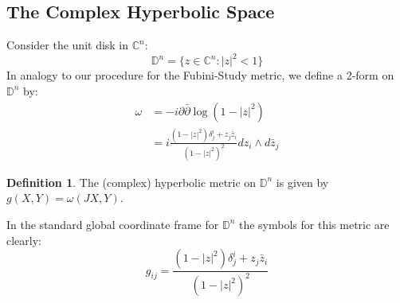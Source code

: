\documentclass[11pt]{amsart}
\theoremstyle{definition}
\newtheorem{definition}[subsection]{Definition}
\def \C{ \mathbb{C} }
\def \del{ \partial }
\def \delbar{ \bar{\partial} }
\def \disk{ \mathbb{D} }
\begin{document}
\subsection{The Complex Hyperbolic Space}

Consider the unit disk in $\C^n$:
%
$$ \disk^n = \{ z \in \C^n : |z|^2 < 1 \} $$
%
In analogy to our procedure for the Fubini-Study metric, we define a 2-form on $\disk^n$ by:
%
\begin{align*}
\omega &= - i \del \delbar \log ( 1 - |z|^2 ) \\
&= i \frac{ (1 - |z|^2) \delta^i_j + z_j \bar{z}_i }{ (1 - |z|^2)^2 } d z_i \wedge d \bar{z}_j
\end{align*}

\begin{definition} The (complex) hyperbolic metric on $\disk^n$ is given by $g(X,Y) = \omega(JX,Y)$.
\end{definition}

In the standard global coordinate frame for $\disk^n$ the symbols for this metric are clearly:
%
$$ g_{ij} = \frac{ (1 - |z|^2) \delta^i_j + z_j \bar{z}_i }{ (1 - |z|^2)^2 } $$
%
\end{document}

